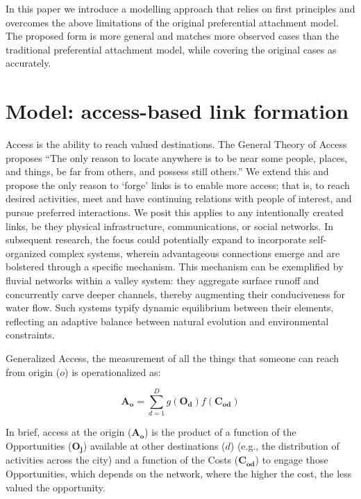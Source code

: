 \documentclass{article}[12pt]
\begin{document}
In this paper we introduce a modelling approach that relies on first principles and overcomes the above limitations of the original preferential attachment model. The proposed form is more general and matches more observed cases than the traditional preferential attachment model, while covering the original cases as accurately.




%

\section{Model: access-based link formation}
Access is the ability to reach valued destinations. The General Theory of Access \citep{levinson2020towards} proposes ``The only reason to locate anywhere is to be near some people, places, and things, be far from others, and possess still others.'' We extend this and propose the only reason to `forge' links is to enable more access; that is, to reach desired activities, meet and have continuing relations with people of interest, and pursue preferred interactions. We posit this applies to any intentionally created links, be they physical infrastructure, communications, or social networks. In subsequent research, the focus could potentially expand to incorporate self-organized complex systems, wherein advantageous connections emerge and are bolstered through a specific mechanism. This mechanism can be exemplified by fluvial networks within a valley system: they aggregate surface runoff and concurrently carve deeper channels, thereby augmenting their conduciveness for water flow. Such systems typify dynamic equilibrium between their elements, reflecting an adaptive balance between natural evolution and environmental constraints.

Generalized Access, the measurement of all the things that someone can reach from origin ($o$) is operationalized as:

\begin{equation}
    \mathbf{A_{o}} = \sum\limits_{d=1}^D g(\mathbf{O_{d}})  f(\mathbf{C_{od}})
    \label{eqn:access-bold}
\end{equation}


In brief, access at the origin ($\mathbf{A_{o}}$) is the product of a function of the Opportunities ($\mathbf{O_{j}}$) available at other destinations ($d$) (e.g., the distribution of activities across the city) and a function of the Costs ($\mathbf{C_{od}}$) to engage those Opportunities, which depends on the network, where the higher the cost, the less valued the opportunity.
\end{document}
